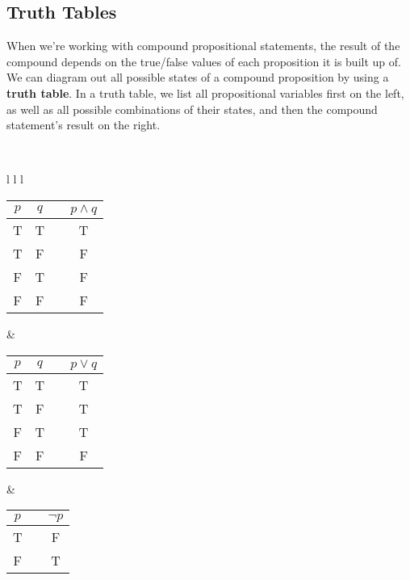     \newpage

    \subsection{Truth Tables}

    \begin{introNOHEAD}{}
        When we're working with compound propositional statements,
        the result of the compound depends on the true/false values
        of each proposition it is built up of.
        ~\\
        We can diagram out all possible states of a compound proposition
        by using a \textbf{truth table}. In a truth table, we list
        all propositional variables first on the left, as well as
        all possible combinations of their states, and then
        the compound statement's result on the right.

        ~\\

        \begin{tabular}{ l l l }

            \begin{tabular}{ | c | c | c | c | }
                \hline
                $p$ & $q$ & & $p \land q$ \\ \hline
                T & T & & T \\ \hline
                T & F & & F \\ \hline
                F & T & & F \\ \hline
                F & F & & F \\ \hline

            \end{tabular}
            &

            \begin{tabular}{ | c | c | c | c | }
                \hline
                $p$ & $q$ & & $p \lor q$ \\ \hline
                T & T & & T \\ \hline
                T & F & & T \\ \hline
                F & T & & T \\ \hline
                F & F & & F \\ \hline

            \end{tabular}
            &

            \begin{tabular}{ | c | c | c | }
                \hline
                $p$ & & $\neg p$ \\ \hline
                T & & F \\ \hline
                F & & T \\ \hline

            \end{tabular}

        \end{tabular}
    \end{introNOHEAD}


